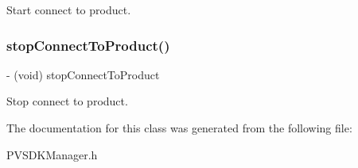 Start connect to product. \mbox{\label{interface_p_v_s_d_k_manager_aedc4680e8cdc972b69dca0d0cdb6f019}} 
\subsubsection{\texorpdfstring{stop\+Connect\+To\+Product()}{stopConnectToProduct()}}
{\footnotesize\ttfamily -\/ (void) stop\+Connect\+To\+Product \begin{DoxyParamCaption}{ }\end{DoxyParamCaption}}

Stop connect to product. 

The documentation for this class was generated from the following file\+:\begin{DoxyCompactItemize}
\item 
P\+V\+S\+D\+K\+Manager.\+h\end{DoxyCompactItemize}
